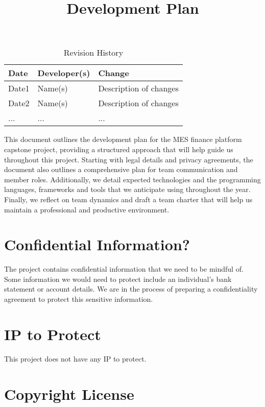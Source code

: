 \documentclass{article}
\title{Development Plan\\\progname}
\author{\authname}
\date{}
\begin{document}
\maketitle

\begin{table}[hp]
\caption{Revision History} \label{TblRevisionHistory}
\begin{tabularx}{\textwidth}{llX}
\toprule
\textbf{Date} & \textbf{Developer(s)} & \textbf{Change}\\
\midrule
Date1 & Name(s) & Description of changes\\
Date2 & Name(s) & Description of changes\\
... & ... & ...\\
\bottomrule
\end{tabularx}
\end{table}

\newpage{}


This document outlines the development plan for the MES finance platform capstone project, providing a structured approach that will help guide us throughout this project. Starting with legal details and privacy agreements, the document also outlines a comprehensive plan for team communication and member roles. Additionally, we detail expected technologies and the programming languages, frameworks and tools that we anticipate using throughout the year. Finally, we reflect on team dynamics and draft a team charter that will help us maintain a professional and productive environment.

\section{Confidential Information?}

The project contains confidential information that we need to be mindful of. Some information we would need to protect include an individual's bank statement or account details. We are in the process of preparing a confidentiality agreement to protect this sensitive information.

\section{IP to Protect}

This project does not have any IP to protect. 

\section{Copyright License}
\end{document}
